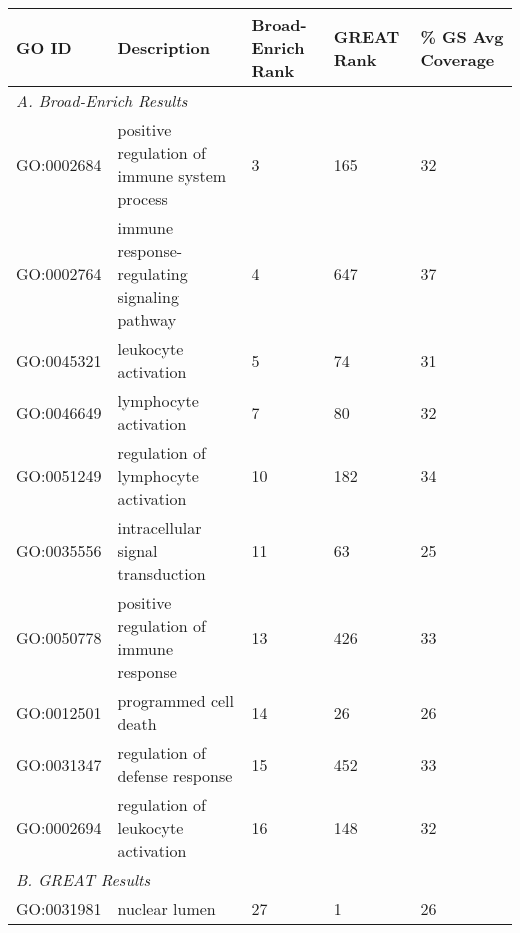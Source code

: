 \begin{table}[!ht]
\tiny
\centering
\begin{tabular}{lllll}
\textbf{GO ID} & \textbf{Description}                         & \textbf{Broad-Enrich Rank} & \textbf{GREAT Rank} & \textbf{\% GS Avg Coverage} \\\hline
\multicolumn{5}{l}{\textit{A.     Broad-Enrich Results}}                                                                                       \\\hline
GO:0002684     & positive regulation of immune system process & 3                          & 165                 & 32                          \\
GO:0002764     & immune response-regulating signaling pathway & 4                          & 647                 & 37                          \\
GO:0045321     & leukocyte activation                         & 5                          & 74                  & 31                          \\
GO:0046649     & lymphocyte activation                        & 7                          & 80                  & 32                          \\
GO:0051249     & regulation of lymphocyte activation          & 10                         & 182                 & 34                          \\
GO:0035556     & intracellular signal transduction            & 11                         & 63                  & 25                          \\
GO:0050778     & positive regulation of immune response       & 13                         & 426                 & 33                          \\
GO:0012501     & programmed cell death                        & 14                         & 26                  & 26                          \\
GO:0031347     & regulation of defense response               & 15                         & 452                 & 33                          \\
GO:0002694     & regulation of leukocyte activation           & 16                         & 148                 & 32                          \\\hline
\multicolumn{5}{l}{\textit{B.      GREAT Results}}                                                                                             \\\hline
GO:0031981     & nuclear lumen                                & 27                         & 1                   & 26                          \\

\end{tabular}
\end{table}

